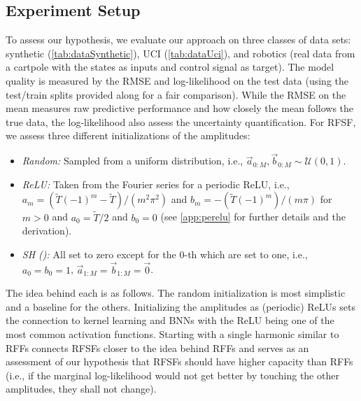\subsection{Experiment Setup}  \label{subsec:setup}
	To assess our hypothesis, we evaluate our approach on three classes of data sets: synthetic (\cref{tab:dataSynthetic}), \ac{UCI}\cite{duaUCIMachineLearning2017} (\cref{tab:dataUci}), and robotics (real data from a cartpole with the states as inputs and control signal as target).
	The model quality is measured by the \ac{RMSE} and log-likelihood on the test data (using the test/train splits provided along\cite{galDropoutBayesianApproximation2016} for a fair comparison).
	While the \ac{RMSE} on the mean measures raw predictive performance and how closely the mean follows the true data, the log-likelihood also assess the uncertainty quantification.
	For \ac{RFSF}, we assess three different initializations of the amplitudes:
	\begin{itemize}
		\item \emph{Random:}               Sampled from a uniform distribution, i.e., $\vec{a}_{0:M}, \vec{b}_{0:M} \sim \mathcal{U}(0, 1)$.
		\item \emph{\ac{ReLU}:}            Taken from the Fourier series for a periodic \ac{ReLU}, i.e., $a_m = (\tilde{T} (-1)^m - \tilde{T}) / (m^2 \pi^2)$ and $b_m = -(\tilde{T} (-1)^m) / (m \pi)$ for $m > 0$ and $a_0 = \tilde{T}/2$ and $b_0 = 0$ (see \cref{app:perelu} for further details and the derivation).
		\item \emph{\acl{SH} ():} All set to zero except for the $0$-th which are set to one, i.e., $a_0 = b_0 = 1$, $\vec{a}_{1:M} = \vec{b}_{1:M} = \vec{0}$.
	\end{itemize}
	The idea behind each is as follows.
	The random initialization is most simplistic and a baseline for the others.
	Initializing the amplitudes as (periodic) \acp{ReLU} sets the connection to kernel learning and \acp{BNN} with the \ac{ReLU} being one of the most common activation functions.
	Starting with a single harmonic similar to \acp{RFF} connects \acp{RFSF} closer to the idea behind \acp{RFF} and serves as an assessment of our hypothesis that \acp{RFSF} should have higher capacity than \acp{RFF} (i.e., if the marginal log-likelihood would not get better by touching the other amplitudes, they shall not change).

